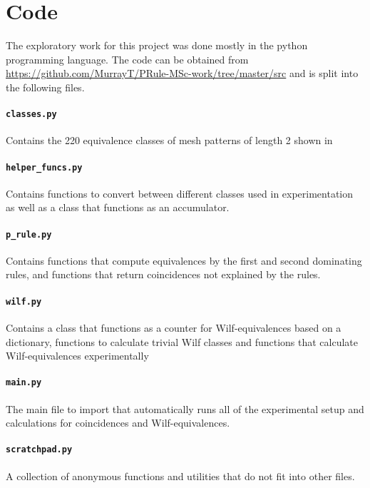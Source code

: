 \chapter{Code}\label{cha:code}
    The exploratory work for this project was done mostly in the python
programming language. The code can be obtained from \url{https://github.com/MurrayT/PRule-MSc-work/tree/master/src}
and is split into the following files.

\subsubsection*{\texttt{classes.py}}
Contains the 220 equivalence classes of mesh patterns of length 2 shown in
\subsubsection*{\texttt{helper\_funcs.py}}
Contains functions to convert between different classes used in experimentation
as well as a class that functions as an accumulator.
\subsubsection*{\texttt{p\_rule.py}}
Contains functions that compute equivalences by the first and second dominating
rules, and functions that return coincidences not explained by the rules.
\subsubsection*{\texttt{wilf.py}}
Contains a class that functions as a counter for Wilf-equivalences based on
a dictionary, functions to calculate trivial Wilf classes and functions that
calculate Wilf-equivalences experimentally
\subsubsection*{\texttt{main.py}}
The main file to import that automatically runs all of the experimental setup
and calculations for coincidences and Wilf-equivalences.
\subsubsection*{\texttt{scratchpad.py}}
A collection of anonymous functions and utilities that do not fit into other
files.


